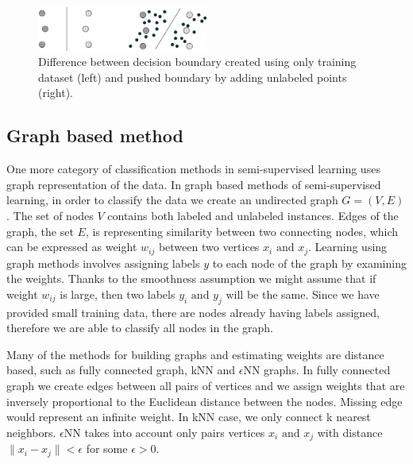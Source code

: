\documentclass[12pt, a4paper, pdflatex]{report}
\begin{document}
\begin{figure}[htbp]
\centering
\includegraphics[width=0.5\textwidth]{graphics/s3vm.png}
\begin{tiny}
\caption{ Difference between decision boundary created using only training dataset (left) and pushed boundary by adding unlabeled points (right).\label{fig:SvmMethodFig}}
\end{tiny}
\vspace{1cm}
\end{figure}

\subsection{Graph based method}

One more category of classification methods in semi-supervised learning uses graph representation of the data. In graph based methods of semi-supervised learning, in order to classify the data we create an undirected graph $ G = (V, E) $. The set of nodes $ V $ contains both labeled and unlabeled instances. Edges of the graph, the set $ E $, is representing similarity between two connecting nodes, which can be expressed as weight $ w_{ij} $ between two vertices $x_{i} \text{ and } x_{j} $. Learning using graph methods involves assigning labels $ y $ to each node of the graph by examining the weights. Thanks to the smoothness assumption we might assume that if weight $ w_{ij} $ is large, then two labels $ y_i \text{ and } y_j $ will be the same. Since we have provided small training data, there are nodes already having labels assigned, therefore we are able to classify all nodes in the graph\cite{Zhu06semi}.

Many of the methods for building graphs and estimating weights are distance based, such as fully connected graph, kNN and $\epsilon$NN graphs\cite{Zhu06semi}. In fully connected graph we create edges between all pairs of vertices and we assign weights that are inversely proportional to the Euclidean distance between the nodes. Missing edge would represent an infinite weight\cite{chapelle06}. In kNN case, we only connect k nearest neighbors. $\epsilon$NN takes into account only pairs vertices $ x_i \text{ and } x_j $ with distance $ \| x_i - x_j \| < \epsilon $ for some $\epsilon > 0$.\\[1cm]
\end{document}
